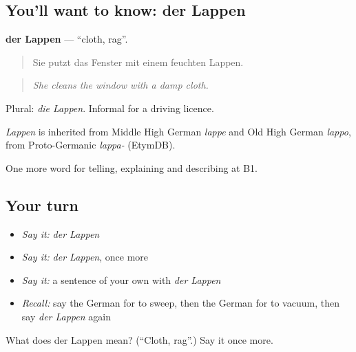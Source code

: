 \subsection*{You'll want to know: der Lappen}
\textbf{der Lappen} — \textquotedblleft{}cloth, rag\textquotedblright{}.

\begin{quote}
Sie putzt das Fenster mit einem feuchten Lappen.
\end{quote}

\begin{quote}
\emph{She cleans the window with a damp cloth.}
\end{quote}

Plural: \emph{die Lappen}. Informal for a driving licence.

\begin{cousinweb}
\emph{Lappen} is inherited from Middle High German \emph{lappe} and Old High German \emph{lappo}, from Proto-Germanic \emph{lappa-} (EtymDB).
\end{cousinweb}

\begin{grammarlens}[title={What you've built}]
One more word for telling, explaining and describing at B1.
\end{grammarlens}

\subsection*{Your turn}
\begin{itemize}
\raggedright
  \item \emph{Say it:} \emph{der Lappen}
  \item \emph{Say it:} \emph{der Lappen}, once more
  \item \emph{Say it:} a sentence of your own with \emph{der Lappen}
  \item \emph{Recall:} say the German for to sweep, then the German for to vacuum, then say \emph{der Lappen} again
\end{itemize}

\begin{tcolorbox}[breakable,colback=teal!4,colframe=teal!35!black,title={Before you move on}]
What does der Lappen mean? (\textquotedblleft{}Cloth, rag\textquotedblright{}.) Say it once more.
\end{tcolorbox}
